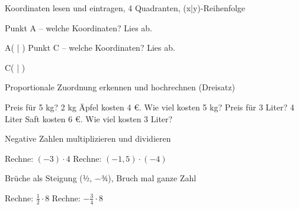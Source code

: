 \setcounter{aufgabe}{0}

\begin{aufgabe}{Koordinaten lesen und eintragen, 4 Quadranten, (x|y)-Reihenfolge}
\begin{teile}
\teil Punkt A – welche Koordinaten? Lies ab.

\begin{ksys}[xmin=-5,xmax=5,ymin=-5,ymax=5,ablesen]  \end{ksys}
A( \leerfeld | \leerfeld )
\teil Punkt C – welche Koordinaten? Lies ab.

\begin{ksys}[xmin=-5,xmax=5,ymin=-5,ymax=5,ablesen]  \end{ksys}
C( \leerfeld | \leerfeld )
\end{teile}
\end{aufgabe}

\begin{aufgabe}{Proportionale Zuordnung erkennen und hochrechnen (Dreisatz)}
\begin{teile}
\teil Preis für 5 kg? 2 kg Äpfel kosten 4 €. Wie viel kosten 5 kg? \leerfeld[€]
\teil Preis für 3 Liter? 4 Liter Saft kosten 6 €. Wie viel kosten 3 Liter? \leerfeld[€]
\end{teile}
\end{aufgabe}

\begin{aufgabe}{Negative Zahlen multiplizieren und dividieren}
\begin{teile}
\teil Rechne: $(-3) \cdot 4$
\teil Rechne: $(-1{,}5) \cdot (-4)$
\end{teile}
\end{aufgabe}

\begin{aufgabe}{Brüche als Steigung (½, −¾), Bruch mal ganze Zahl}
\begin{teile}
\teil Rechne: $\frac{1}{2} \cdot 8$
\teil Rechne: $-\frac{3}{4} \cdot 8$
\end{teile}
\end{aufgabe}

